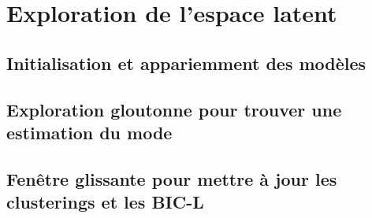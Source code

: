 \documentclass[12pt,a4paper]{rapport1}
\begin{document}
\section{Exploration de l'espace latent}
\subsection{Initialisation et appariemment des modèles}

\subsection{Exploration gloutonne pour trouver une estimation du mode}

\subsection{Fenêtre glissante pour mettre à jour les clusterings et les BIC-L}

\listoffigures
\listoftables
\end{document}
